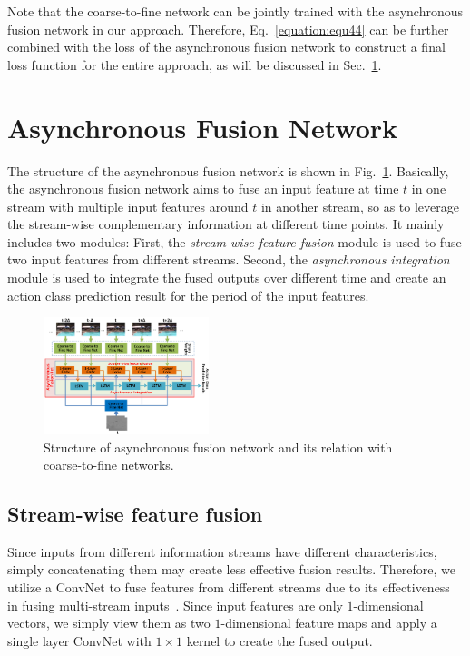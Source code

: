 \documentclass[letterpaper]{article}
\begin{document}
Note that the coarse-to-fine network can be jointly trained with the asynchronous fusion network in our approach. Therefore, Eq.~\ref{equation:equ44} can be further combined with the loss of the asynchronous fusion network to construct a final loss function for the entire approach, as will be discussed in Sec.~\ref{section:Asynchronuous}.





\section{Asynchronous Fusion Network}\label{section:Asynchronuous}

The structure of the asynchronous fusion network is shown in Fig.~\ref{fig:asynchronous}. Basically, the asynchronous fusion network aims to fuse an input feature at time $t$ in one stream with multiple input features around $t$ in another stream, so as to leverage the stream-wise complementary information at different time points. It mainly includes two modules: First, the \emph{stream-wise feature fusion} module is used to fuse two input features from different streams. Second, the \emph{asynchronous integration} module is used to integrate the fused outputs over different time and create an action class prediction result for the period of the input features.

\begin{figure}
  \centering
  \includegraphics[width=0.43\textwidth,height=0.27\textwidth]{./figures1/asynchronous.png}
  \caption{Structure of asynchronous fusion network and its relation with coarse-to-fine networks.} %
    \label{fig:asynchronous}
\end{figure}


\subsection{Stream-wise feature fusion}

Since inputs from different information streams have different characteristics, simply concatenating them may create less effective fusion results. Therefore, we utilize a ConvNet to fuse features from different streams due to its effectiveness in fusing multi-stream inputs~\cite{twostreamfuse}. Since input features are only $1$-dimensional vectors, we simply view them as two $1$-dimensional feature maps and apply a single layer ConvNet with $1\times 1$ kernel to create the fused output.
\end{document}
